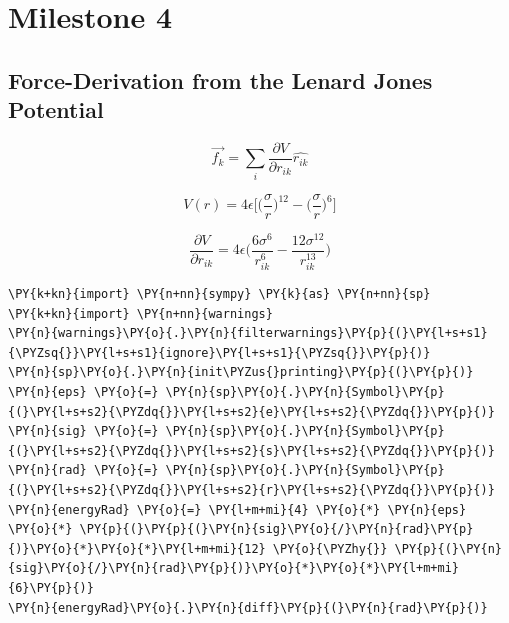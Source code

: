 \chapter{Milestone 4}
\section{Force-Derivation from the Lenard Jones Potential}

\begin{equation}
	\overrightarrow{f_{k}} = \sum_{i}^{}\frac{\partial V}{\partial r_{ik}} \hat{r_{ik}}
\end{equation}

\begin{equation}
	V(r) = 4\epsilon\bigg[\Big(\frac{\sigma}{r}\Big)^{12}- \Big(\frac{\sigma}{r}\Big)^{6} \bigg]
\end{equation}

\begin{equation}
	\frac{\partial V}{\partial r_{ik}} = 4\epsilon\Bigg(\frac{6\sigma^{6}}{r_{ik}^{6}} - \frac{12\sigma^{12}}{r_{ik}^{13}} \Bigg)
\end{equation}

    \begin{tcolorbox}[breakable, size=fbox, boxrule=1pt, pad at break*=1mm,colback=cellbackground, colframe=cellborder]
\begin{Verbatim}[commandchars=\\\{\}]
\PY{k+kn}{import} \PY{n+nn}{sympy} \PY{k}{as} \PY{n+nn}{sp}
\PY{k+kn}{import} \PY{n+nn}{warnings}
\PY{n}{warnings}\PY{o}{.}\PY{n}{filterwarnings}\PY{p}{(}\PY{l+s+s1}{\PYZsq{}}\PY{l+s+s1}{ignore}\PY{l+s+s1}{\PYZsq{}}\PY{p}{)}
\PY{n}{sp}\PY{o}{.}\PY{n}{init\PYZus{}printing}\PY{p}{(}\PY{p}{)}
\PY{n}{eps} \PY{o}{=} \PY{n}{sp}\PY{o}{.}\PY{n}{Symbol}\PY{p}{(}\PY{l+s+s2}{\PYZdq{}}\PY{l+s+s2}{e}\PY{l+s+s2}{\PYZdq{}}\PY{p}{)}
\PY{n}{sig} \PY{o}{=} \PY{n}{sp}\PY{o}{.}\PY{n}{Symbol}\PY{p}{(}\PY{l+s+s2}{\PYZdq{}}\PY{l+s+s2}{s}\PY{l+s+s2}{\PYZdq{}}\PY{p}{)}
\PY{n}{rad} \PY{o}{=} \PY{n}{sp}\PY{o}{.}\PY{n}{Symbol}\PY{p}{(}\PY{l+s+s2}{\PYZdq{}}\PY{l+s+s2}{r}\PY{l+s+s2}{\PYZdq{}}\PY{p}{)}
\PY{n}{energyRad} \PY{o}{=} \PY{l+m+mi}{4} \PY{o}{*} \PY{n}{eps} \PY{o}{*} \PY{p}{(}\PY{p}{(}\PY{n}{sig}\PY{o}{/}\PY{n}{rad}\PY{p}{)}\PY{o}{*}\PY{o}{*}\PY{l+m+mi}{12} \PY{o}{\PYZhy{}} \PY{p}{(}\PY{n}{sig}\PY{o}{/}\PY{n}{rad}\PY{p}{)}\PY{o}{*}\PY{o}{*}\PY{l+m+mi}{6}\PY{p}{)}
\PY{n}{energyRad}\PY{o}{.}\PY{n}{diff}\PY{p}{(}\PY{n}{rad}\PY{p}{)}
\end{Verbatim}
\end{tcolorbox}

